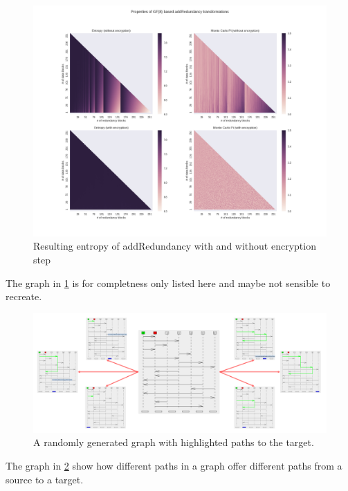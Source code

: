 \documentclass[11pt]{extarticle}
\begin{document}
	\begin{figure}[H]\centering
		\includegraphics[width=1\textwidth]{inc/randomblock_10kb}
		\caption{Resulting entropy of addRedundancy with and without encryption step}
		\label{fig:entropy}
	\end{figure}
	The graph in \cref{fig:entropy} is for completness only listed here and maybe not sensible to recreate.

	\begin{figure}[H]\centering
		\includegraphics[width=1\textwidth]{inc/messageGraphPaths}
		\caption{A randomly generated graph with highlighted paths to the target.}
		\label{fig:messageGraphPaths}
	\end{figure}
    The graph in \cref{fig:messageGraphPaths} show how different paths in a graph offer different paths from a source to a target.
\end{document}
